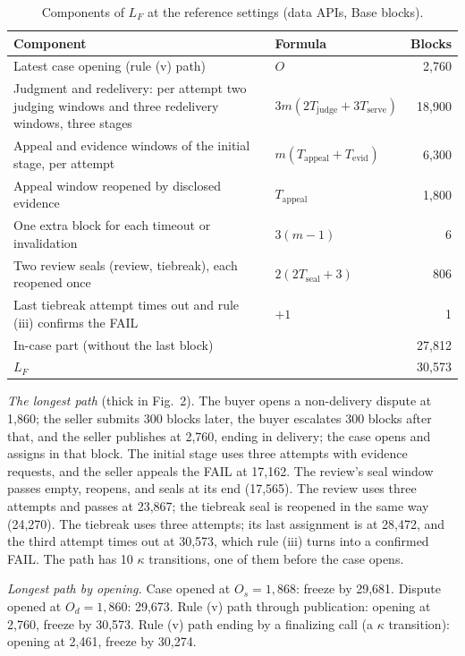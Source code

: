 \documentclass[10pt,a4paper]{article}
\theoremstyle{plain}
\theoremstyle{remark}
\begin{document}
\begin{table}[!htbp]
\centering
\caption{Components of $L_F$ at the reference settings (data APIs, Base blocks).}
\label{tab:lf}
\footnotesize
\begin{tabular}{@{}p{8.2cm}lr@{}}
\toprule
Component & Formula & Blocks \\
\midrule
Latest case opening (rule (v) path) & $O$ & 2,760 \\
Judgment and redelivery: per attempt two judging windows and three redelivery windows, three stages & $3m(2T_{\mathrm{judge}}+3T_{\mathrm{serve}})$ & 18,900 \\
Appeal and evidence windows of the initial stage, per attempt & $m(T_{\mathrm{appeal}}+T_{\mathrm{evid}})$ & 6,300 \\
Appeal window reopened by disclosed evidence & $T_{\mathrm{appeal}}$ & 1,800 \\
One extra block for each timeout or invalidation & $3(m-1)$ & 6 \\
Two review seals (review, tiebreak), each reopened once & $2(2T_{\mathrm{seal}}+3)$ & 806 \\
Last tiebreak attempt times out and rule (iii) confirms the FAIL & $+1$ & 1 \\
\midrule
In-case part (without the last block) & & 27,812 \\
$L_F$ & & 30,573 \\
\bottomrule
\end{tabular}
\end{table}

\emph{The longest path} (thick in Fig.~2). The buyer opens a non-delivery dispute at 1,860; the seller submits 300 blocks later, the buyer escalates 300 blocks after that, and the seller publishes at 2,760, ending in delivery; the case opens and assigns in that block. The initial stage uses three attempts with evidence requests, and the seller appeals the FAIL at 17,162. The review's seal window passes empty, reopens, and seals at its end (17,565). The review uses three attempts and passes at 23,867; the tiebreak seal is reopened in the same way (24,270). The tiebreak uses three attempts; its last assignment is at 28,472, and the third attempt times out at 30,573, which rule (iii) turns into a confirmed FAIL. The path has 10 $\kappa$ transitions, one of them before the case opens.

\emph{Longest path by opening.} Case opened at $O_s=1{,}868$: freeze by 29,681. Dispute opened at $O_d=1{,}860$: 29,673. Rule (v) path through publication: opening at 2,760, freeze by 30,573. Rule (v) path ending by a finalizing call (a $\kappa$ transition): opening at 2,461, freeze by 30,274.
\end{document}
